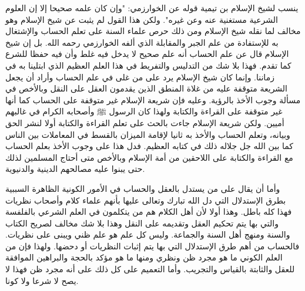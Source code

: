 ينسب لشيخ الإسلام بن تيمية قوله عن الخوارزمي: "وإن كان علمه صحيحا إلا إن العلوم الشرعية مستغنية عنه وعن غيره". ولكن هذا القول لم يثبت عن شيخ الإسلام وهو مخالف لما نقله شيخ الإسلام ومن ذلك حرص علماء السنة على تعلم الحساب والإشتغال به للإستفادة من علم الجبر والمقابلة الذي ألفه الخوارزمي رحمه الله. بل إن شيخ الإسلام قال عن علم الحساب أنه علم صحيح لا يدخل فيه غلط وأن فيه حفظا للشرع كما تقدم. فهذا بلا شك من التدليس والتفريط في هذا العلم العظيم الذي ابتلينا به في زماننا. وإنما كان شيخ الإسلام يرد على من غلى في علم الحساب وأراد أن يجعل الشريعة متوقفة عليه من غلاة المنطق الذين يقدمون العقل على النقل وبالأخص في مسألة وجوب الأخذ بالرؤية. وعليه فإن شريعة الإسلام غير متوقفة على الحساب كما أنها غير متوقفة على القراءة والكتابة ولهذا كان الرسول ﷺ وأصحابه الكرام في غالبهم أميين. ولكن شريعة الإسلام جاءت بالحث على تعلم القراءة والكتابة أولا لنشر الحق وبيانه، وتعلم الحساب والأخذ به ثانيا لإقامة الميزان بالقسط في المعاملات بين الناس كما بين الله جل جلاله ذلك في كتابه العظيم. فدل هذا على وجوب الأخذ بعلم الحساب مع القراءة والكتابة على اللاحقين من أمة الإسلام وبالأخص متى أحتاج المسلمين لذلك حتى يبنوا عليه مصالحهم الدينية والدنيوية. 

وأما أن يقال على من يستدل بالعقل والحساب في الأمور الكونية الظاهرة السببية بطرق الإستدلال التي دل الله تبارك وتعالى عليها بأنهم علماء كلام وأصحاب نظريات فهذا كله باطل. وهذا أولا لأن أهل الكلام هم من يتكلمون في العلم الشرعي بالفلفسة والتي بها يتم تحكيم العقل وتقديمه على النقل وهذا بلا شك مخالف لصريح الكتاب والسنة ومنهج أهل السنة والجماعة. وليس كل علم هو علم ظني ويبنى على نظريات. فالحساب من أهم طرق الإستدلال التي بها يتم إثبات النظريات أو دحضها. ولهذا فإن من العلم الكوني ما هو مجرد ظن ونظري ومنها ما هو مؤكد بالحجة والبراهين الموافقة للعقل والثابتة بالقياس والتجريب. وأما التعميم على كل ذلك على أنه مجرد ظن فهذا لا يصح لا شرعا ولا كونا. 

